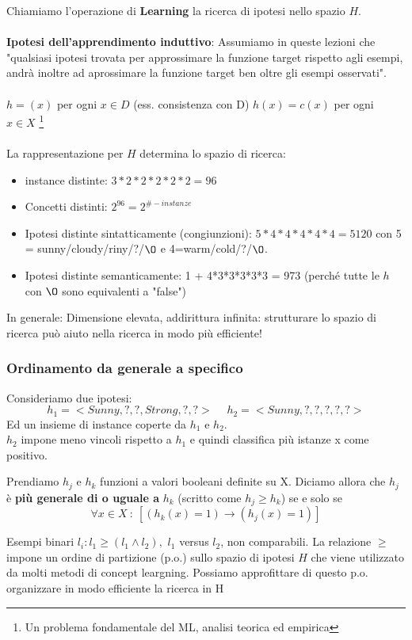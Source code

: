 Chiamiamo l'operazione di \textbf{Learning} la ricerca di ipotesi nello spazio $H$.\\\\
\textbf{Ipotesi dell'apprendimento induttivo}: Assumiamo in queste lezioni che "qualsiasi ipotesi trovata per approssimare la funzione target rispetto agli
esempi, andrà inoltre ad aprossimare la funzione target ben oltre gli esempi osservati".\\\\
$h=(x)$ per ogni $x \in D$ (ess. consistenza con D) \hspace{15pt} $h(x) = c(x)$ per ogni $x \in X$ \footnote{Un problema fondamentale del ML, analisi teorica ed empirica}\\\\
La rappresentazione per $H$ determina lo spazio di ricerca:
\begin{itemize}
    \item instance distinte: $3*2*2*2*2*2 = 96$
    \item Concetti distinti: $2^{96} = 2^{\#-instanze}$
    \item Ipotesi distinte sintatticamente (congiunzioni): $5*4*4*4*4*4 = 5120$ con 5 = sunny/cloudy/riny/?/$\O$ e 4=warm/cold/?/$\O$.
    \item Ipotesi distinte semanticamente: 1 + 4*3*3*3*3*3 = 973 (perché tutte le $h$ con $\O$ sono equivalenti a "false")
\end{itemize}
In generale: Dimensione elevata, addirittura infinita: strutturare lo spazio di ricerca può aiuto nella ricerca in modo più efficiente!

\subsubsection{Ordinamento da generale a specifico}
Consideriamo due ipotesi:
$$h_1 = <Sunny, ?, ?, Strong, ?, ?> \hspace{15pt} h_2 = <Sunny, ?, ?, ?, ?, ?>$$
Ed un insieme di instance coperte da $h_1$ e $h_2$.\\
$h_2$ impone meno vincoli rispetto a $h_1$ e quindi classifica più istanze x come positivo.
\begin{definition}
    Prendiamo $h_j$ e $h_k$ funzioni a valori booleani definite su X. Diciamo allora che $h_j$ è \textbf{più generale di o uguale a} $h_k$ (scritto come $h_j \geq h_k$) se e solo se
    $$\forall x \in X \: :\: [(h_k(x) = 1) \to (h_j(x) = 1)]$$
\end{definition}
\begin{example}
    Esempi binari $l_i: l_1 \geq (l_1 \land l_2),$ $l_1$ versus $l_2$, non comparabili. La relazione $\geq$ impone un 
    ordine di partizione (p.o.) sullo spazio di ipotesi $H$ che viene utilizzato da molti metodi di concept leargning. Possiamo approfittare di questo p.o. organizzare in modo efficiente la ricerca in H
\end{example}

